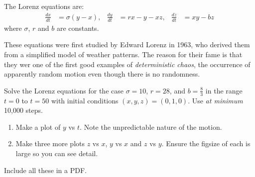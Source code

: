 \documentclass[11pt,letterpaper]{article}
\begin{document}
\begin{problem}
The Lorenz equations are:
\begin{align*}
 \frac{dx}{dt} &= \sigma(y-x), & \frac{dy}{dt}&= rx-y-xz, & \frac{dz}{dt}&=xy-bz
\end{align*}
where $\sigma$, $r$ and $b$ are constants. 

These equations were first studied by Edward Lorenz in 1963, who derived them from a simplified 
model of weather patterns. The reason for their fame is that they wer one of the first good examples
of \emph{deterministic chaos}, the occurrence of apparently random motion even though there is
no randomness. 

Solve the Lorenz equations for the case $\sigma=10$, $r=28$, and $b=\frac{8}{3}$ in the 
range $t=0$ to $t=50$ with initial conditions $(x,y,z) = (0,1,0)$. Use \emph{at minimum}
10,000 steps. 

\begin{enumerate}
 \item Make a plot of $y$ vs $t$. Note the unpredictable nature of the motion.
 \item Make three more plots $z$ vs $x$, $y$ vs $x$ and $z$ vs $y$. Ensure the figsize of each
is large so you can see detail.
\end{enumerate}

Include all these in a PDF.


\end{problem}
\end{document}
